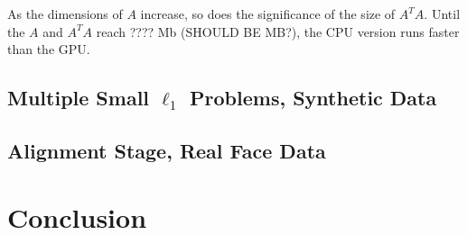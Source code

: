 \documentclass[10pt,twocolumn,letterpaper]{article}
\begin{document}
As the dimensions of $A$ increase, so does the significance of the size of
$A^TA$.  Until the $A$ and $A^TA$ reach ???? Mb (SHOULD BE MB?), the CPU version runs faster
than the GPU.  

\subsection{Multiple Small $\ell_1$ Problems, Synthetic Data}

\subsection{Alignment Stage, Real Face Data}

\section{Conclusion}

{\small


}
\end{document}
